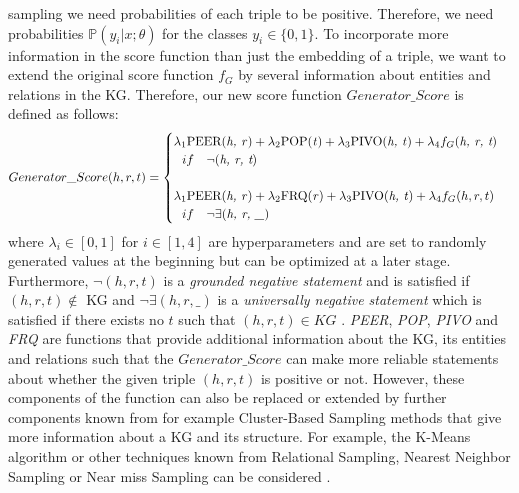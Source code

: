 sampling we need probabilities of each triple to be positive. 
Therefore, we need probabilities $\mathds{P}(y_i | x; \theta)$ for the classes $y_i \in \{0, 1\}$.
To incorporate more information in the score function than just the embedding of a triple, we want to extend the original score function $f_G$ by several information about entities and relations in the \ac{KG}.
Therefore, our new score function $Generator\_Score$ is defined as follows:
\begin{equation}
    Generator\_Score(h, r, t)=
    \begin{cases}
         \lambda_1 \text{PEER(\textit{h, r})} + \lambda_2 \text{POP(\textit{t})} + \lambda_3 \text{PIVO(\textit{h, t})} + \lambda_4 f_G(\textit{h, r, t})
         \\ \ \ 
         if\ \ \ \neg(\textit{h, r, t})
         \\ \\
         \lambda_1 \text{PEER(\textit{h, r})} + \lambda_2 \text{FRQ(\textit{r})} + \lambda_3 \text{PIVO(\textit{h, t})} + \lambda_4 f_G(h, r, t)
         \\ \ \ 
         if\ \ \ \neg \exists (\textit{h, r, \_})
         \\
    \end{cases}
\end{equation}
where $\lambda_i \in [0, 1]$ for $i \in [1,4]$ are hyperparameters and are set to randomly generated values at the beginning but can be optimized at a later stage.
Furthermore, $\neg (h, r, t)$ is a \textit{grounded negative statement} and is satisfied if $(h, r, t) \notin$ \ac{KG} and $\neg\exists(h, r, \_)$ is a \textit{universally negative statement} which is satisfied if there exists no $t$ such that $(h, r, t) \in KG$ \cite{arnaout2020enriching}.
\textit{PEER}, \textit{POP}, \textit{PIVO} and \textit{FRQ} are functions that provide additional information about the \ac{KG}, its entities and relations such that the $Generator\_Score$ can make more reliable statements about whether the given triple $(h, r, t)$ is positive or not.
However, these components of the function can also be replaced or extended by further components known from for example Cluster-Based Sampling methods that give more information about a \ac{KG} and its structure.
For example, the K-Means algorithm \cite{qianunderstanding} or other techniques known from Relational Sampling, Nearest Neighbor Sampling or Near miss Sampling can be considered \cite{kotnis2017analysis}.

